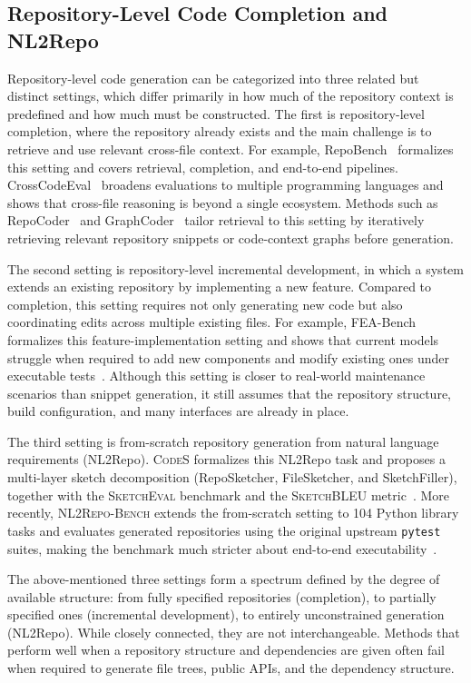 \documentclass[format=acmsmall, review=false, screen=true]{acmart}
\newcommand{\codes}{\textsc{CodeS}\xspace}
\newcommand{\sketcheval}{\textsc{SketchEval}\xspace}
\newcommand{\sketchbleu}{\textsc{SketchBLEU}\xspace}
\newcommand{\nlrepobench}{\textsc{NL2Repo-Bench}\xspace}
\begin{document}
\subsection{Repository-Level Code Completion and NL2Repo}
Repository-level code generation can be categorized into three related but distinct settings, which differ primarily in how much of the repository context is predefined and how much must be constructed. The first is repository-level completion, where the repository already exists and the main challenge is to retrieve and use relevant cross-file context. For example, RepoBench~\cite{Liu2023RepoBench} formalizes this setting and covers retrieval, completion, and end-to-end pipelines. CrossCodeEval~\cite{Ding2023CrossCodeEval} broadens evaluations to multiple programming languages and shows that cross-file reasoning is beyond a single ecosystem. Methods such as RepoCoder~\cite{Zhang2023RepoCoder} and GraphCoder~\cite{Liu2024GraphCoder} tailor retrieval to this setting by iteratively retrieving relevant repository snippets or code-context graphs before generation.

The second setting is repository-level incremental development, in which a system extends an existing repository by implementing a new feature. Compared to completion, this setting requires not only generating new code but also coordinating edits across multiple existing files. For example, FEA-Bench formalizes this feature-implementation setting and shows that current models struggle when required to add new components and modify existing ones under executable tests~\cite{Li2025FEABench}. Although this setting is closer to real-world maintenance scenarios than snippet generation, it still assumes that the repository structure, build configuration, and many interfaces are already in place.

The third setting is from-scratch repository generation from natural language requirements (NL2Repo). \codes formalizes this NL2Repo task and proposes a multi-layer sketch decomposition (RepoSketcher, FileSketcher, and SketchFiller), together with the \sketcheval benchmark and the \sketchbleu metric~\cite{Zan2025CodeS}. More recently, \nlrepobench extends the from-scratch setting to 104 Python library tasks and evaluates generated repositories using the original upstream \texttt{pytest} suites, making the benchmark much stricter about end-to-end executability~\cite{Ding2025NL2RepoBench}. 

The above-mentioned three settings form a spectrum defined by the degree of available structure: from fully specified repositories (completion), to partially specified ones (incremental development), to entirely unconstrained generation (NL2Repo). While closely connected, they are not interchangeable. Methods that perform well when a repository structure and dependencies are given often fail when required to generate file trees, public APIs, and the dependency structure.
\end{document}
